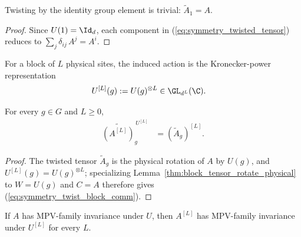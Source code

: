 \begin{lemma}\label{lem:twisted_tensor_one}
    \leanok
    Twisting by the identity group element is trivial:
    $\widetilde{A}_1=A$.
\end{lemma}

\begin{proof}\leanok{}
    Since $U(1)=\Id_d$, each component in
    (\ref{eq:symmetry_twisted_tensor}) reduces to
    $\sum_j\delta_{ij}\,A^j=A^i$.
\end{proof}

\begin{definition}
    \label{def:block_kron_action}
    \leanok
    For a block of $L$ physical sites, the induced action is the
    Kronecker-power representation
    \begin{align}
        U^{[L]}(g) & :=U(g)^{\otimes L}
        \in\GL_{d^L}(\C).
        \notag
    \end{align}
\end{definition}

\begin{lemma}
    \label{lem:twisted_tensor_block_comm}
    \leanok
    For every $g\in G$ and $L\ge0$,
    \begin{align}
        \widetilde{(A^{[L]})}^{\,U^{[L]}}_g
         & =(\widetilde A_g)^{[L]}.
        \label{eq:symmetry_twist_block_comm}
    \end{align}
\end{lemma}

\begin{proof}\leanok
    The twisted tensor $\widetilde A_g$ is the physical rotation of $A$ by
    $U(g)$, and $U^{[L]}(g)=U(g)^{\otimes L}$; specializing
    Lemma~\ref{thm:block_tensor_rotate_physical} to $W=U(g)$ and $C=A$
    therefore gives (\ref{eq:symmetry_twist_block_comm}).
\end{proof}

\begin{lemma}
    \label{thm:on_site_symmetric_block_tensor}
    \leanok
    If $A$ has MPV-family invariance under $U$, then $A^{[L]}$ has
    MPV-family invariance under $U^{[L]}$ for every $L$.
\end{lemma}

